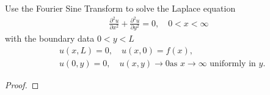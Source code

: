 \begin{problem}{7}
  Use the Fourier Sine Transform to solve the Laplace equation
  \begin{align*}
    \frac{\partial^2 u}{\partial x^2} + \frac{\partial^2 u}{\partial y^2}= 0 , \quad 0 < x < \infty
  \end{align*}
  with the boundary data $0 < y < L$
  \begin{align*}
    &u(x, L) = 0, \quad u(x, 0) = f(x), \\
    &u(0, y) = 0, \quad u(x, y) \to 0 \text{as $x \to \infty$ uniformly in $y$}.
  \end{align*}
\end{problem}

\begin{proof}
\end{proof}
\newpage
